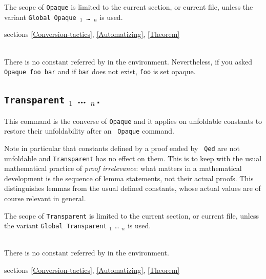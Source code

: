 The scope of {\tt Opaque} is limited to the current section, or
current file, unless the variant {\tt Global Opaque \qualid$_1$ {\ldots}
\qualid$_n$} is used.

\SeeAlso sections \ref{Conversion-tactics}, \ref{Automatizing},
\ref{Theorem}

\begin{ErrMsgs}
\item {}\\
    There is no constant referred by {\qualid} in the environment.
    Nevertheless, if you asked \texttt{Opaque foo bar}
    and if \texttt{bar} does not exist, \texttt{foo} is set opaque.
\end{ErrMsgs}

\subsection[{\tt Transparent} \qualid$_1$ {\ldots} \qualid$_n${\tt .}]{{\tt Transparent} \qualid$_1$ {\ldots} \qualid$_n${\tt .}\label{Transparent}}
This command is the converse of {\tt Opaque} and it applies on
unfoldable constants to restore their unfoldability after an {\tt
Opaque} command.

Note in particular that constants defined by a proof ended by {\tt
Qed} are not unfoldable and {\tt Transparent} has no effect on
them. This is to keep with the usual mathematical practice of {\em
proof irrelevance}: what matters in a mathematical development is the
sequence of lemma statements, not their actual proofs. This
distinguishes lemmas from the usual defined constants, whose actual
values are of course relevant in general.

The scope of {\tt Transparent} is limited to the current section, or
current file, unless the variant {\tt Global Transparent} \qualid$_1$
{\ldots} \qualid$_n$ is used.

\begin{ErrMsgs}
\item {}\\
    There is no constant referred by {\qualid} in the environment.
\end{ErrMsgs}

\SeeAlso sections \ref{Conversion-tactics}, \ref{Automatizing},
\ref{Theorem}


